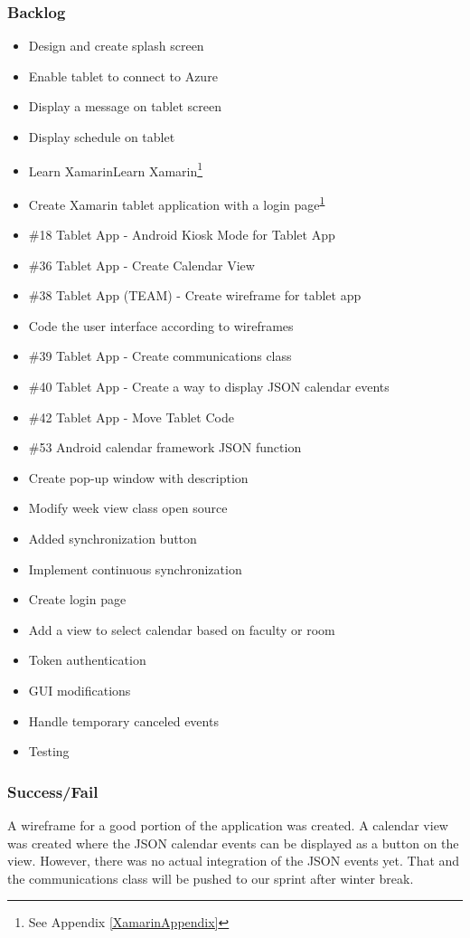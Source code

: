 \subsubsection{Backlog}
\begin{itemize}
\item Design and create splash screen
\item Enable tablet to connect to Azure
\item Display a message on tablet screen
\item Display schedule on tablet	
\item Learn XamarinLearn Xamarin\footnote{See Appendix \ref{XamarinAppendix}\label{note3}}
\item Create Xamarin tablet application with a login page\textsuperscript{\ref{note3}}
\item \#18 Tablet App - Android Kiosk Mode for Tablet App
\item \#36 Tablet App - Create Calendar View
\item \#38 Tablet App (TEAM) - Create wireframe for tablet app
\item Code the user interface according to wireframes
\item \#39 Tablet App - Create communications class
\item \#40 Tablet App - Create a way to display JSON calendar events
\item \#42 Tablet App - Move Tablet Code
\item \#53 Android calendar framework JSON function
\item Create pop-up window with description
\item Modify week view class open source
\item Added synchronization button
\item Implement continuous synchronization
\item Create login page
\item Add a view to select calendar based on faculty or room
\item Token authentication
\item GUI modifications
\item Handle temporary canceled events
\item Testing
\end{itemize}

\subsubsection{Success/Fail}
A wireframe for a good portion of the application was created.  A calendar view was created where the JSON calendar events can be displayed as a button on the view.  However, there was no actual integration of the JSON events yet.  That and the communications class will be pushed to our sprint after winter break.

